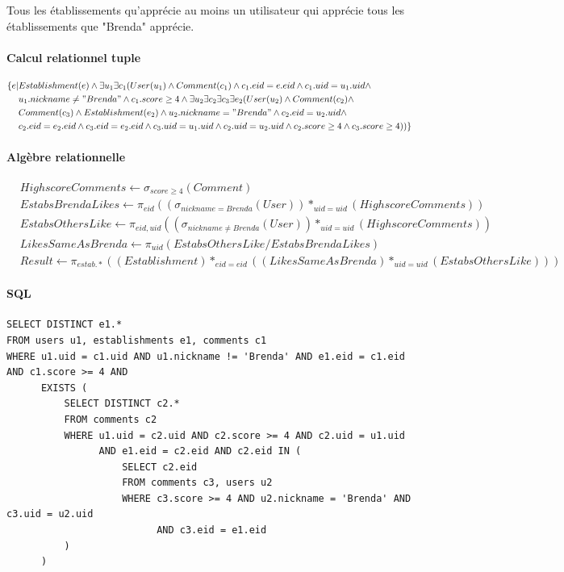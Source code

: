\documentclass[11pt,a4paper]{report}
\begin{document}
\noindent Tous les établissements qu’apprécie au moins un utilisateur qui apprécie tous les établissements que "Brenda" apprécie.
\paragraph*{Calcul relationnel tuple}
\begin{align*}
\{e|& Establishment(e) \wedge \exists u_{1} \exists c_{1} (User(u_{1}) \wedge Comment(c_{1}) \wedge c_{1}.eid = e.eid \wedge c_{1}.uid=u_{1}.uid \wedge \\
& u_{1}.nickname \neq "Brenda" \wedge c_{1}.score \geq 4 \wedge  \exists u_{2} \exists c_{2} \exists c_{3} \exists e_{2} ( User(u_{2}) \wedge Comment(c_{2})\wedge \\
& Comment(c_{3}) \wedge Establishment(e_{2}) \wedge u_{2}.nickname = "Brenda" \wedge c_{2}.eid = u_{2}.uid \wedge \\
& c_{2}.eid = e_{2}.eid \wedge  c_{3}.eid = e_{2}.eid \wedge  c_{3}.uid = u_{1}.uid \wedge  c_{2}.uid = u_{2}.uid \wedge c_{2}.score \geq 4 \wedge c_{3}.score \geq 4
))
\}
\end{align*}
\paragraph*{Algèbre relationnelle}
\begin{align*}
& HighscoreComments \leftarrow \sigma_{score \ge 4} (Comment) \\
& EstabsBrendaLikes \leftarrow \pi_{eid} ( (\sigma_{nickname=Brenda} (User)) *_{uid=uid} (HighscoreComments) ) \\
& EstabsOthersLike \leftarrow \pi_{eid, uid} ( (\sigma_{nickname \neq Brenda} (User)) *_{uid=uid} (HighscoreComments) ) \\
& LikesSameAsBrenda \leftarrow \pi_{uid} (EstabsOthersLike / EstabsBrendaLikes) \\
& Result \leftarrow \pi_{estab.*} ((Establishment) *_{eid=eid} ((LikesSameAsBrenda) *_{uid=uid} (EstabsOthersLike)))
\end{align*}
\paragraph*{SQL}
\begin{verbatim}
SELECT DISTINCT e1.*
FROM users u1, establishments e1, comments c1
WHERE u1.uid = c1.uid AND u1.nickname != 'Brenda' AND e1.eid = c1.eid AND c1.score >= 4 AND 
      EXISTS (
          SELECT DISTINCT c2.*
          FROM comments c2 
          WHERE u1.uid = c2.uid AND c2.score >= 4 AND c2.uid = u1.uid 
          		AND e1.eid = c2.eid AND c2.eid IN (
              		SELECT c2.eid
              		FROM comments c3, users u2
              		WHERE c3.score >= 4 AND u2.nickname = 'Brenda' AND c3.uid = u2.uid 
                    	  AND c3.eid = e1.eid
          )
      )
\end{verbatim}
\end{document}
